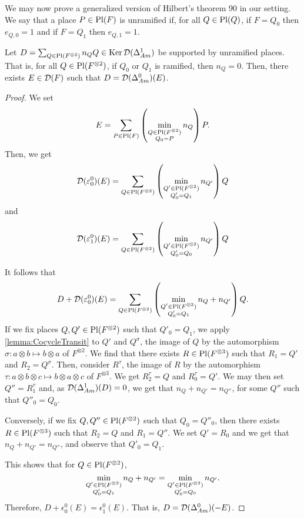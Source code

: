We may now prove a generalized version of Hilbert's theorem 90 in our setting. We say that a place \(P \in \operatorname{Pl}(F)\) is unramified if, for all \(Q \in \operatorname{Pl}(Q)\), if \(F = Q_0\) then \(e_{Q,0} = 1\) and if \(F = Q_1\) then \(e_{Q,1} = 1\).
\begin{lemma}\label{lemma:Hilbert90}
    Let \(D = \sum_{Q \in \operatorname{Pl}(F^{\otimes 2})} n_Q Q \in \operatorname{Ker} \operatorname{\mathcal{D}}(\Delta_{Am}^1)\) be supported by unramified places. That is, for all \(Q \in \operatorname{Pl}(F^{\otimes 2})\), if \(Q_0\) or \(Q_1\) is ramified, then \(n_Q = 0\). Then, there exists \(E \in \operatorname{\mathcal{D}}(F)\) such that \(D = \operatorname{\mathcal{D}}(\Delta_{Am}^0)(E)\).
\end{lemma}

\begin{proof}
    We set
    \[E = \sum_{P \in \operatorname{Pl}(F)} \left(\min_{\substack{Q \in \operatorname{Pl}(F^{\otimes 2}) \\ Q_0 = P}} n_Q \right) P.\]
    Then, we get 
    \[\operatorname{\mathcal{D}}(\varepsilon_0^0)(E) = \sum_{Q \in \operatorname{Pl}(F^{\otimes 2})} \left(\min_{\substack{Q' \in \operatorname{Pl}(F^{\otimes 2}) \\ Q'_0 = Q_1}}  n_{Q'}\right) Q\]
    and
    \[\operatorname{\mathcal{D}}(\varepsilon_1^0)(E) = \sum_{Q \in \operatorname{Pl}(F^{\otimes 2})} \left(\min_{\substack{Q' \in \operatorname{Pl}(F^{\otimes 2}) \\ Q'_0 = Q_0}}  n_{Q'}\right) Q\]

    It follows that
    \[D + \operatorname{\mathcal{D}}(\varepsilon_0^0)(E) = \sum_{Q \in \operatorname{Pl}(F^{\otimes 2})} \left(\min_{\substack{Q' \in \operatorname{Pl}(F^{\otimes 2}) \\ Q'_0 = Q_1}}  n_Q + n_{Q'}\right) Q.\]
    If we fix places \(Q,Q' \in \operatorname{Pl}(F^{\otimes 2})\) such that \(Q'_0 = Q_1\), we apply \cref{lemma:CocycleTransit} to \(Q'\) and \(Q^\sigma\), the image of \(Q\) by the automorphism \(\sigma\colon a \otimes b \mapsto b \otimes a\) of \(F^{\otimes 2}\). We find that there exists \(R \in \operatorname{Pl}(F^{\otimes 3})\) such that \(R_1 = Q'\) and \(R_2 = Q^\sigma\). Then, consider \(R^\tau\), the image of \(R\) by the automorphism \(\tau \colon a \otimes b \otimes c \mapsto b \otimes a \otimes c\) of \(F^{\otimes 3}\). We get \(R^\tau_2 = Q\) and \(R^\tau_0 = Q'\). We may then set \(Q'' = R^\tau_1\) and, as \(\operatorname{\mathcal{D}}(\Delta_{Am}^1)(D) = 0\), we get that \(n_Q + n_{Q'} = n_{Q''}\), for some \(Q''\) such that \(Q''_0 = Q_0\).

    Conversely, if we fix \(Q,Q'' \in \operatorname{Pl}(F^{\otimes 2})\) such that \(Q_0 = Q''_0\), then there exists \(R \in \operatorname{Pl}(F^{\otimes 3})\) such that \(R_2 = Q\) and \(R_1 = Q''\). We set \(Q' = R_0\) and we get that \(n_Q + n_{Q'} = n_{Q''}\), and observe that \(Q'_0 = Q_1\).

    This shows that for \(Q \in \operatorname{Pl}(F^{\otimes 2})\), \[\min_{\substack{Q' \in \operatorname{Pl}(F^{\otimes 2}) \\ Q'_0 = Q_1}}  n_Q + n_{Q'} = \min_{\substack{Q' \in \operatorname{Pl}(F^{\otimes 2}) \\ Q'_0 = Q_0}}  n_{Q'}.\]
    Therefore, \(D + \epsilon_0^0(E) = \epsilon_1^0(E)\). That is, \(D = \operatorname{\mathcal{D}}(\Delta_{Am}^0)(-E)\).
\end{proof}


